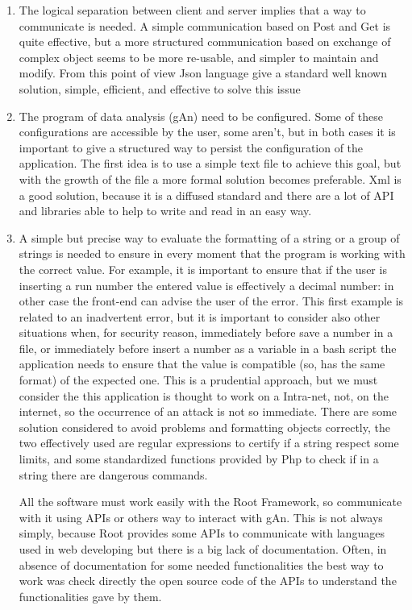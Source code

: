 \begin{enumerate}
\item
The logical separation between client and server implies that a way to communicate is needed. A simple communication based on Post and Get is quite effective, but a more structured communication based on exchange of complex object seems to be more re-usable, and simpler to maintain and modify. From this point of view Json language give a standard well known solution, simple, efficient, and effective to solve this issue  

\item
The program of data analysis (gAn) need to be configured. Some of these configurations are accessible by the user, some aren't, but in both cases it is important to give a structured way to persist the configuration of the application. The first idea is to use a simple text file to achieve this goal, but with the growth of the file a more formal solution becomes preferable. Xml is a good solution, because it is a diffused standard and there are a lot of API and libraries able to help to write and read in an easy way.  

\item
A simple but precise way to evaluate the formatting of a string or a group of strings is needed to ensure in every moment that the program is working with the correct value. For example, it is important to ensure that if the user is inserting a run number the entered value is effectively a decimal number: in other case the front-end can advise the user of the error. This first example is related to an inadvertent error, but it is important to consider also other situations when, for security reason, immediately before save a number in a file, or immediately before insert a number as a variable in a bash script the application needs to ensure that the value is compatible (so, has the same format) of the expected one. This is a prudential approach, but we must consider the this application is thought to work on a Intra-net, not, on the internet, so the occurrence of an attack is not so immediate. There are some solution considered to avoid problems and formatting objects correctly, the two effectively used are regular expressions to certify if a string respect some limits, and some standardized functions provided by Php to check if in a string there are dangerous commands.
 
All the software must work easily with the Root Framework, so communicate with it using APIs or others way to interact with gAn. This is not always simply, because Root provides some APIs to communicate with languages used in web developing but there is a big lack of documentation. Often, in absence of documentation for some needed functionalities the best way to work was check directly the open source code of the APIs to understand the functionalities gave by them.

\end{enumerate}

